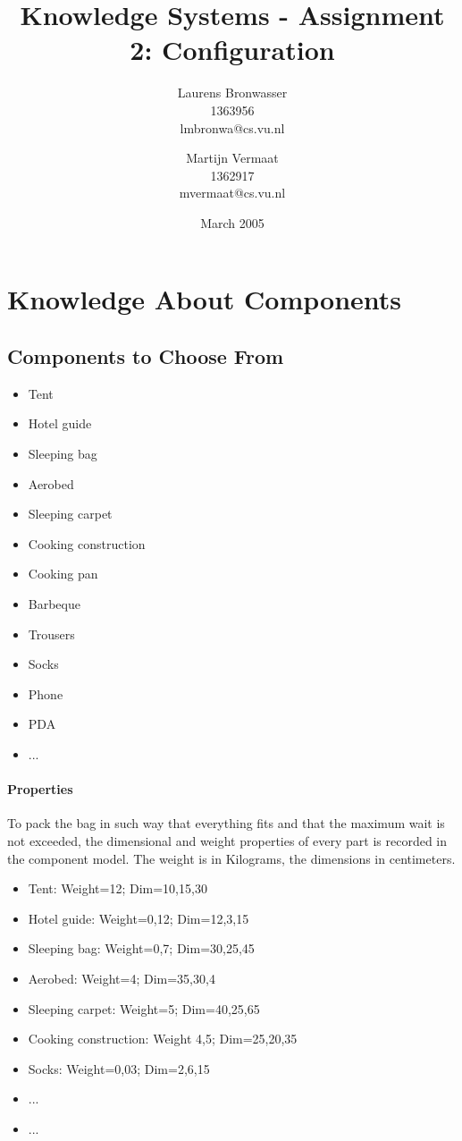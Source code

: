 \documentclass[a4paper,11pt]{article}
\title{Knowledge Systems - Assignment 2: Configuration}
\author{Laurens Bronwasser\\
1363956\\
lmbronwa@cs.vu.nl
\and
Martijn Vermaat\\
1362917\\
mvermaat@cs.vu.nl}
\date{March 2005}
\begin{document}
\maketitle




\tableofcontents


\section{Knowledge About Components}


\subsection*{Components to Choose From}

\begin{itemize}
\item Tent 
\item Hotel guide 
\item Sleeping bag 
\item Aerobed 
\item Sleeping carpet 
\item Cooking construction
\item Cooking pan
\item Barbeque
\item Trousers
\item Socks
\item Phone
\item PDA
\item ...
\end{itemize}

\paragraph{Properties}

To pack the bag in such way that everything fits and that the maximum wait is 
not exceeded, the dimensional and weight properties of every part is recorded in
the component model. The weight is in Kilograms, the dimensions in centimeters.

\begin{itemize}
\item Tent: Weight=12; Dim=10,15,30
\item Hotel guide: Weight=0,12; Dim=12,3,15
\item Sleeping bag: Weight=0,7; Dim=30,25,45
\item Aerobed: Weight=4; Dim=35,30,4
\item Sleeping carpet: Weight=5; Dim=40,25,65
\item Cooking construction: Weight 4,5; Dim=25,20,35
\item Socks: Weight=0,03; Dim=2,6,15
\item ...
\item ...
\end{itemize}
\end{document}
